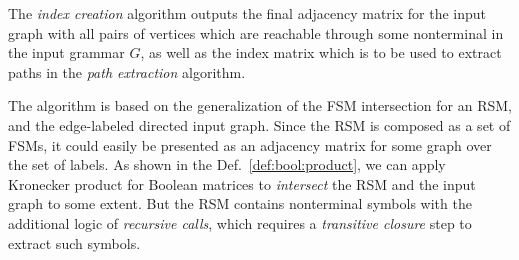 
The \textit{index creation} algorithm outputs the final adjacency matrix for the input graph with all pairs of vertices which are reachable through some nonterminal in the input grammar $G$, as well as the index matrix which is to be used to extract paths in the \textit{path extraction} algorithm.

The algorithm is based on the generalization of the FSM intersection for an RSM,  and the edge-labeled directed input graph.
Since the RSM is composed as a set of FSMs, it could easily be presented as an adjacency matrix for some graph over the set of labels.
As shown in the Def.~\ref{def:bool:product}, we can apply Kronecker product for Boolean matrices to \textit{intersect} the RSM and the input graph to some extent.
But the RSM contains nonterminal symbols with the additional logic of \textit{recursive calls}, which requires a \textit{transitive closure} step to extract such symbols.

